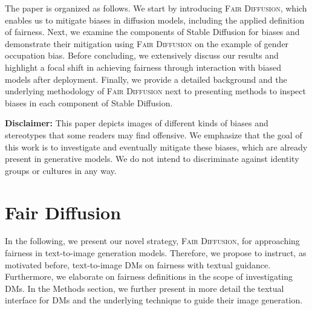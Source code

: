 \documentclass{article}%
\begin{document}
The paper is organized as follows. We start by introducing \textsc{Fair Diffusion}, which enables us to mitigate biases in diffusion models, including the applied definition of fairness. Next, we examine the components of Stable Diffusion for biases and demonstrate their mitigation using \textsc{Fair Diffusion} on the example of gender occupation bias.
Before concluding, we extensively discuss our results and highlight a focal shift in achieving fairness through interaction with biased models after deployment. Finally, we provide a detailed background and the underlying methodology of \textsc{Fair Diffusion} next to presenting methods to inspect biases in each component of Stable Diffusion.



\textbf{Disclaimer:} This paper depicts images of different kinds of biases and stereotypes that some readers may find offensive. 
We emphasize that the goal of this work is to investigate and eventually mitigate these biases, which are already present in generative models.
We do not intend to discriminate against identity groups or cultures in any way.

\section*{Fair Diffusion}
\label{sec:large_pretrained_models}
In the following, we present our novel strategy, \textsc{Fair Diffusion}, for approaching fairness in text-to-image generation models. Therefore, we propose to instruct, as motivated before, text-to-image DMs on fairness with textual guidance. Furthermore, we elaborate on fairness definitions in the scope of investigating DMs. In the Methods section, we further present in more detail the textual interface for DMs and the underlying technique to guide their image generation.
\end{document}
